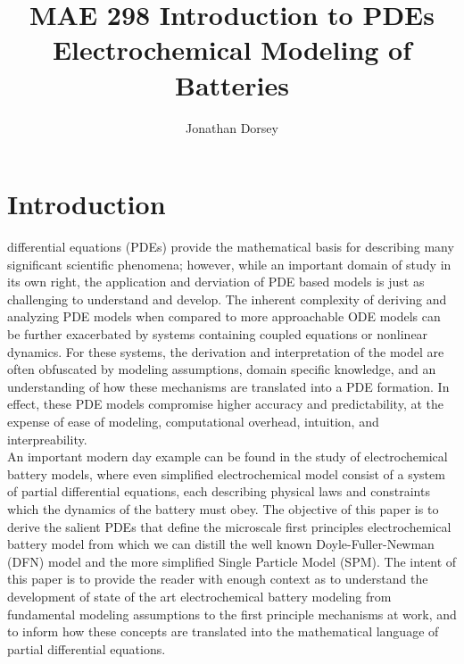 \documentclass[lettersize,journal]{IEEEtran}
\begin{document}
\title{MAE 298 Introduction to PDEs \\ Electrochemical Modeling of Batteries}

\author{Jonathan Dorsey}



\maketitle


\section{Introduction}
 differential equations (PDEs) provide the mathematical basis for describing many significant scientific phenomena; however, while an important domain of study in its own right, the application and derviation of PDE based models is just as challenging to understand and develop. The inherent complexity of deriving and analyzing PDE models when compared to more approachable ODE models can be further exacerbated by systems containing coupled equations or nonlinear dynamics. For these systems, the derivation and interpretation of the model are often obfuscated by modeling assumptions, domain specific knowledge, and an understanding of how these mechanisms are translated into a PDE formation. In effect, these PDE models compromise higher accuracy and predictability, at the expense of ease of modeling, computational overhead, intuition, and interpreability. \\

An important modern day example can be found in the study of electrochemical battery models, where even simplified electrochemical model consist of a system of partial differential equations, each describing physical laws and constraints which the dynamics of the battery must obey. The objective of this paper is to derive the salient PDEs that define the microscale first principles electrochemical battery model from which we can distill the well known Doyle-Fuller-Newman (DFN) model and the more simplified Single Particle Model (SPM). The intent of this paper is to provide the reader with enough context as to understand the development of state of the art electrochemical battery modeling from fundamental modeling assumptions to the first principle mechanisms at work, and to inform how these concepts are translated into the mathematical language of partial differential equations.
\end{document}
